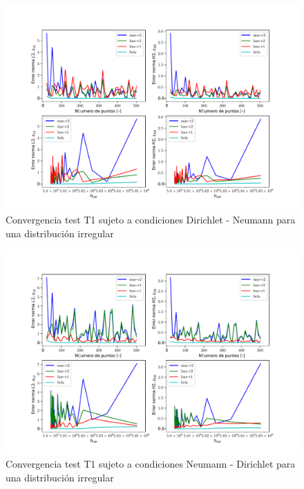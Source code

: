 \begin{figure}
    \centering
    \includegraphics[width=1\textwidth]{./Imagenes/06/comparacion_shp_irreg/T1_irreg_type-2_caso-2_direct_dgesv-lapack-blas_sme-v2_lme-v2_lme-v1_fwls.pdf}
    \caption{Convergencia test T1 sujeto a condiciones Dirichlet - Neumann para una distribución irregular} \label{fig:T1_caso-2_conv_irreg}
\end{figure}
\begin{figure}
    \centering
    \includegraphics[width=1\textwidth]{./Imagenes/06/comparacion_shp_irreg/T1_irreg_type-2_caso-3_direct_dgesv-lapack-blas_sme-v2_lme-v2_lme-v1_fwls.pdf}
    \caption{Convergencia test T1 sujeto a condiciones Neumann - Dirichlet para una distribución irregular} \label{fig:T1_caso-3_conv_irreg}
\end{figure}


